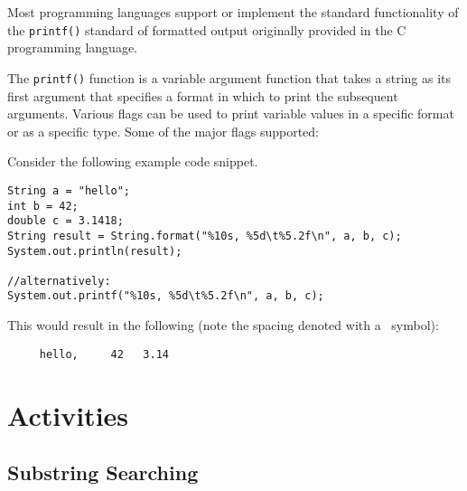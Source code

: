 \documentclass[12pt]{scrartcl}
\begin{document}
Most programming languages support or implement the standard 
functionality of the \texttt{printf()} standard of formatted 
output originally provided in the C programming language.

The \texttt{printf()} function is a variable argument 
function that takes a string as its first argument that specifies 
a format in which to print the subsequent arguments.  Various flags 
can be used to print variable values in a specific format or as a 
specific type.  Some of the major flags supported:
	
Consider the following example code snippet.

\begin{verbatim}
String a = "hello"; 
int b = 42;
double c = 3.1418;
String result = String.format("%10s, %5d\t%5.2f\n", a, b, c);
System.out.println(result);

//alternatively:
System.out.printf("%10s, %5d\t%5.2f\n", a, b, c);
\end{verbatim}

This would result in the following (note the spacing denoted
with a \textvisiblespace\ symbol):

\begin{verbatim}
     hello,     42	 3.14
\end{verbatim}     

\section*{Activities}

\subsection*{Substring Searching}
\end{document}
